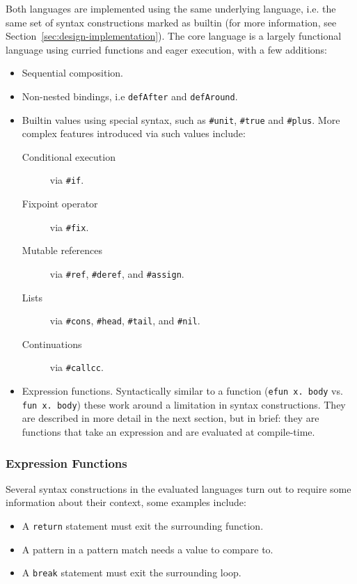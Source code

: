 \documentclass{kththesis}
\begin{document}
Both languages are implemented using the same underlying language, i.e. the same set of syntax constructions marked as builtin (for more information, see Section~\ref{sec:design-implementation}). The core language is a largely functional language using curried functions and eager execution, with a few additions:
\begin{itemize}
  \item Sequential composition.
  \item Non-nested bindings, i.e \texttt{defAfter} and \texttt{defAround}. %
  \item Builtin values using special syntax, such as \texttt{#unit}, \texttt{#true} and \texttt{#plus}. More complex features introduced via such values include:
  \begin{description}
    \item[Conditional execution] via \texttt{#if}.
    \item[Fixpoint operator] via \texttt{#fix}.
    \item[Mutable references] via \texttt{#ref}, \texttt{#deref}, and \texttt{#assign}.
    \item[Lists] via \texttt{#cons}, \texttt{#head}, \texttt{#tail}, and \texttt{#nil}.
    \item[Continuations] via \texttt{#callcc}.
  \end{description}
  \item Expression functions. Syntactically similar to a function (\texttt{efun x. body} vs. \texttt{fun x. body}) these work around a limitation in syntax constructions. They are described in more detail in the next section, but in brief: they are functions that take an expression and are evaluated at compile-time.
\end{itemize}

\subsubsection{Expression Functions} \label{sec:efun-drawbacks}

Several syntax constructions in the evaluated languages turn out to require some information about their context, some examples include:

\begin{itemize}
  \item A \texttt{return} statement must exit the surrounding function.
  \item A pattern in a pattern match needs a value to compare to.
  \item A \texttt{break} statement must exit the surrounding loop.
\end{itemize}
\end{document}

